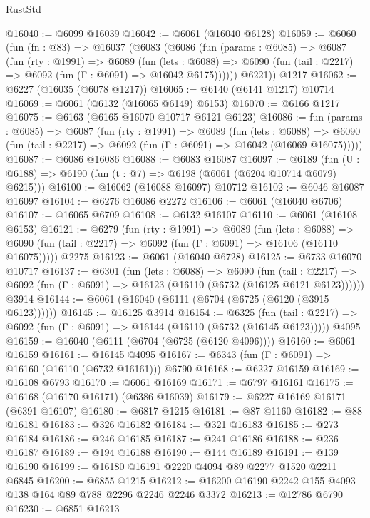 \begin{lexlean}{RustStd}
\begin{coremodule}
{\begin{coremodule}
{{{{{{{{{{{{{{{{{{{{{{{{{{@16040 := @6099 @16039
@16042 := @6061 (@16040 @6128)
@16059 := @6060
    (fun (fn : @83) =>
    @16037
      (@6083
        (@6086
          (fun (params : @6085) =>
          @6087
            (fun (rty : @1991) =>
            @6089
              (fun (lets : @6088) =>
              @6090 (fun (tail : @2217) => @6092 (fun (Γ : @6091) => @16042 @6175))))))
        @6221))
    @1217
@16062 := @6227 (@16035 (@6078 @1217))
@16065 := @6140 (@6141 @1217) @10714
@16069 := @6061 (@6132 (@16065 @6149) @6153)
@16070 := @6166 @1217
@16075 := @6163 (@6165 @16070 @10717 @6121 @6123)
@16086 := fun (params : @6085) =>
  @6087
    (fun (rty : @1991) =>
    @6089
      (fun (lets : @6088) =>
      @6090 (fun (tail : @2217) => @6092 (fun (Γ : @6091) => @16042 (@16069 @16075)))))
@16087 := @6086 @16086
@16088 := @6083 @16087
@16097 := @6189
    (fun (U : @6188) => @6190 (fun (t : @7) => @6198 (@6061 (@6204 @10714 @6079) @6215)))
@16100 := @16062 (@16088 @16097) @10712
@16102 := @6046 @16087 @16097
@16104 := @6276 @16086 @2272
@16106 := @6061 (@16040 @6706)
@16107 := @16065 @6709
@16108 := @6132 @16107
@16110 := @6061 (@16108 @6153)
@16121 := @6279
    (fun (rty : @1991) =>
    @6089
      (fun (lets : @6088) =>
      @6090 (fun (tail : @2217) => @6092 (fun (Γ : @6091) => @16106 (@16110 @16075)))))
    @2275
@16123 := @6061 (@16040 @6728)
@16125 := @6733 @16070 @10717
@16137 := @6301
    (fun (lets : @6088) =>
    @6090
      (fun (tail : @2217) =>
      @6092 (fun (Γ : @6091) => @16123 (@16110 (@6732 (@16125 @6121 @6123))))))
    @3914
@16144 := @6061 (@16040 (@6111 (@6704 (@6725 (@6120 (@3915 @6123))))))
@16145 := @16125 @3914
@16154 := @6325
    (fun (tail : @2217) => @6092 (fun (Γ : @6091) => @16144 (@16110 (@6732 (@16145 @6123)))))
    @4095
@16159 := @16040 (@6111 (@6704 (@6725 (@6120 @4096))))
@16160 := @6061 @16159
@16161 := @16145 @4095
@16167 := @6343 (fun (Γ : @6091) => @16160 (@16110 (@6732 @16161))) @6790
@16168 := @6227 @16159
@16169 := @16108 @6793
@16170 := @6061 @16169
@16171 := @6797 @16161
@16175 := @16168 (@16170 @16171) (@6386 @16039)
@16179 := @6227 @16169 @16171 (@6391 @16107)
@16180 := @6817 @1215
@16181 := @87 @1160
@16182 := @88 @16181
@16183 := @326 @16182
@16184 := @321 @16183
@16185 := @273 @16184
@16186 := @246 @16185
@16187 := @241 @16186
@16188 := @236 @16187
@16189 := @194 @16188
@16190 := @144 @16189
@16191 := @139 @16190
@16199 := @16180 @16191 @2220 @4094 @89 @2277 @1520 @2211 @6845
@16200 := @6855 @1215
@16212 := @16200 @16190 @2242 @155 @4093 @138 @164 @89 @788 @2296 @2246 @2246 @3372
@16213 := @12786 @6790
@16230 := @6851
    @16213
}}}}}}}}}}}}}}}}}}}}}}}}}}
\end{coremodule}}
\end{coremodule}
\end{lexlean}
